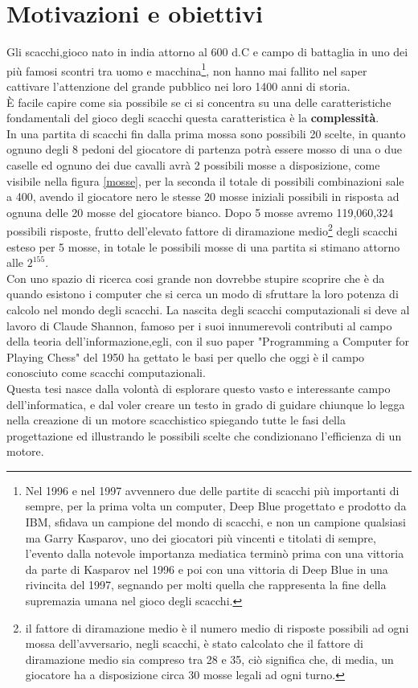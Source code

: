 \section{Motivazioni e obiettivi}
Gli scacchi,gioco nato in india attorno al 600 d.C e campo di battaglia in uno dei più famosi scontri tra uomo e macchina\footnote{Nel 1996 e nel 1997 avvennero due delle partite di scacchi più importanti di sempre,
 per la prima volta un computer, Deep Blue progettato e prodotto da IBM, sfidava un campione del mondo di scacchi, e non un campione qualsiasi ma Garry Kasparov, uno dei giocatori più vincenti e titolati di sempre, 
 l'evento dalla notevole importanza mediatica terminò prima con una vittoria da parte di Kasparov nel 1996 e poi con una vittoria di Deep Blue in una rivincita del 1997, segnando per molti quella che rappresenta la
  fine della supremazia umana nel gioco degli scacchi. }, non hanno mai fallito nel saper cattivare  l'attenzione del grande pubblico nei loro 1400 anni di storia.
 \\È facile capire come sia possibile se ci si concentra su una delle caratteristiche fondamentali del 
 gioco degli scacchi  questa caratteristica è la \textbf{complessità}.\\In una partita di scacchi fin dalla prima mossa 
sono possibili 20 scelte, in quanto ognuno degli 8 pedoni del giocatore di partenza potrà essere mosso di una o due caselle ed ognuno dei due cavalli avrà 2 possibili mosse a disposizione, come visibile nella figura \ref{mosse}, per la seconda il totale di possibili combinazioni sale a 400, avendo il giocatore nero le stesse 20 mosse iniziali possibili in risposta ad ognuna delle 20 mosse del giocatore bianco.
 Dopo 5 mosse avremo 119,060,324 possibili risposte, frutto dell'elevato fattore di diramazione medio\footnote{ il fattore di diramazione medio è il numero medio di risposte possibili ad ogni mossa dell'avversario, negli scacchi, è stato calcolato che il fattore di diramazione medio sia compreso tra 28 e 35, ciò significa che, di media, un giocatore ha a disposizione circa 30 mosse legali ad ogni turno.} degli scacchi esteso per 5 mosse, in totale le possibili mosse di una partita si stimano attorno alle \(2^{155} \).
 \\Con uno spazio di ricerca cosi grande non dovrebbe stupire scoprire che è da quando esistono i computer che si cerca un modo
 di sfruttare la loro potenza di calcolo nel mondo degli scacchi.
 La nascita degli scacchi computazionali si deve al lavoro di Claude Shannon, famoso per i suoi innumerevoli contributi al 
 campo della teoria dell'informazione,egli, con il suo paper "Programming a Computer for Playing Chess"\cite{shannon} del 1950 ha gettato le
 basi per quello che oggi è il campo conosciuto come scacchi computazionali.
 \\Questa tesi nasce dalla volontà di esplorare questo vasto e interessante campo dell'informatica, e dal voler creare un testo
 in grado di guidare chiunque lo legga nella creazione di un motore scacchistico spiegando tutte le fasi della progettazione
 ed illustrando le possibili scelte che condizionano l'efficienza di un motore.



